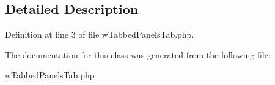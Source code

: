 \subsection{Detailed Description}


Definition at line 3 of file wTabbedPanelsTab.php.



The documentation for this class was generated from the following file:\begin{DoxyCompactItemize}
\item 
wTabbedPanelsTab.php\end{DoxyCompactItemize}
